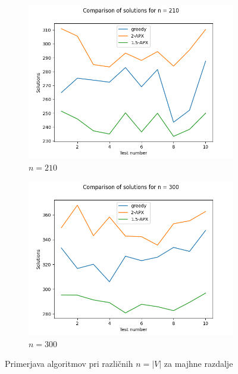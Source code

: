 \documentclass{article}
\begin{document}
\begin{figure}
\begin{subfigure}{0.5\textwidth}
		\includegraphics[width=\textwidth]{figs/results10-3.png}
		\caption{$n = 210$}
		\label{fig:rezultat10-3}
	\end{subfigure}
	\begin{subfigure}{0.5\textwidth}
		\centering
		\includegraphics[width=\textwidth]{figs/results10-4.png}
		\caption{$n = 300$}
		\label{fig:rezultat10-4}
	\end{subfigure}
	\caption{Primerjava algoritmov pri različnih $n = |V|$ za majhne razdalje}
	\label{fig:rezultati10}
\end{figure}
\end{document}
